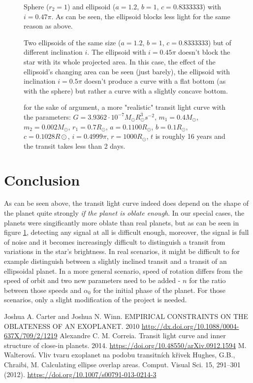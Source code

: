 \documentclass[10pt]{article}
\numberwithin{equation}{subsection}
\begin{document}
\begin{figure}[H]
  \centering
  
  \caption{Sphere ($r_2=1$) and ellipsoid ($a=1.2$, $b=1$, $c=0.8333333$) with $i=0.47\pi$.
  As can be seen, the ellipsoid blocks less light for the same reason as above.}
\end{figure}
\begin{figure}[H]
  \centering
  
  \caption{Two ellipsoids of the same size ($a=1.2$, $b=1$, $c=0.8333333$) but of different
  inclination $i$. The ellipsoid with $i=0.45\pi$ doesn't block the star with its whole
  projected area. In this case, the effect of the ellipsoid's changing area can be seen
  (just barely), the ellipsoid with inclination $i=0.5\pi$ doesn't produce a curve
  with a flat bottom (as with the sphere) but rather a curve with a slightly concave
  bottom.}
\end{figure}
\begin{figure}[H]
  \centering
  
  \caption{for the sake of argument, a more "realistic" transit light curve with the parameters:
  $G = 3.9362\cdot 10^{-7}M_\odot R^3_\odot s^{-2}$, $m_1 = 0.4M_\odot$, $m_2 = 0.002M_\odot$, $r_1 = 0.7R_\odot$, $a = 0.1100R_\odot$, $b = 0.1R_\odot$, $c = 0.1028R\odot$, $i = 0.4999\pi$, $r = 1000R_\odot$,
  $t$ is roughly 16 years and the transit takes less than 2 days.}
  \label{fig:6}
\end{figure}
\section{Conclusion}
As can be seen above, the transit light curve indeed does depend on the shape of the planet
quite strongly \emph{if the planet is oblate enough}. In our special cases, the planets
were singificantly more oblate than real planets, but as can be seen in figure \ref{fig:6},
detecting any signal at all is difficult enough, moreover, the signal is full of noise
and it becomes increasingly difficult to distinguish a transit from variations in the star's
brightness. In real scenarios, it might be difficult to for example distinguish between
a slightly inclined transit and a transit of an ellipsoidal planet. In a more general
scenario, speed of rotation differs from the speed of orbit and two new parameters
need to be added - $n$ for the ratio between those speeds and $\alpha_0$ for the
initial phase of the planet. For those scenarios,
only a slight modification of the project is needed.
\begin{thebibliography}{5}
   Joshua A. Carter and Joshua N. Winn. EMPIRICAL CONSTRAINTS ON THE OBLATENESS OF AN EXOPLANET. 2010 \url{http://dx.doi.org/10.1088/0004-637X/709/2/1219}
   Alexandre C. M. Correia. Transit light curve and inner structure of close-in planets. 2014. \url{https://doi.org/10.48550/arXiv.0912.1594}
   M. Walterová. Vliv tvaru exoplanet na podobu transitních křivek \url{}
   Hughes, G.B., Chraibi, M. Calculating ellipse overlap areas. Comput. Visual Sci. 15, 291–301 (2012). \url{https://doi.org/10.1007/s00791-013-0214-3}
\end{thebibliography}
\end{document}
